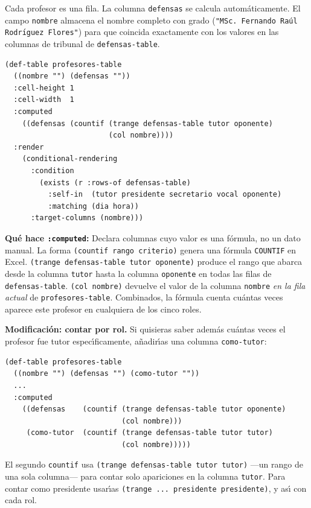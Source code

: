 \documentclass[12pt,a4paper]{report}
\begin{document}
Cada profesor es una fila.
La columna \texttt{defensas} se calcula autom\'aticamente.
El campo \texttt{nombre} almacena el nombre completo con grado
(\texttt{"MSc.\ Fernando Ra\'ul Rodr\'{\i}guez Flores"}) para que
coincida exactamente con los valores en las columnas de tribunal de
\texttt{defensas-table}.

\begin{lstlisting}[caption={tutorial-horario.lisp --- tabla de profesores.},
                   firstnumber=10]
(def-table profesores-table
  ((nombre "") (defensas ""))
  :cell-height 1
  :cell-width  1
  :computed
    ((defensas (countif (trange defensas-table tutor oponente)
                        (col nombre))))
  :render
    (conditional-rendering
      :condition
        (exists (r :rows-of defensas-table)
          :self-in  (tutor presidente secretario vocal oponente)
          :matching (dia hora))
      :target-columns (nombre)))
\end{lstlisting}

\textbf{Qu\'e hace \texttt{:computed}:}
Declara columnas cuyo valor es una f\'ormula, no un dato manual.
La forma \texttt{(countif rango criterio)} genera una f\'ormula
\texttt{COUNTIF} en Excel.
\texttt{(trange defensas-table tutor oponente)} produce el rango que
abarca desde la columna \texttt{tutor} hasta la columna \texttt{oponente}
en todas las filas de \texttt{defensas-table}.
\texttt{(col nombre)} devuelve el valor de la columna \texttt{nombre}
\emph{en la fila actual} de \texttt{profesores-table}.
Combinados, la f\'ormula cuenta cu\'antas veces aparece este profesor
en cualquiera de los cinco roles.

\textbf{Modificaci\'on: contar por rol.}
Si quisieras saber adem\'as cu\'antas veces el profesor fue tutor
espec\'{\i}ficamente, a\~nadir\'{\i}as una columna \texttt{como-tutor}:

\begin{lstlisting}[caption={Columna adicional: solo tutores.},numbers=none]
(def-table profesores-table
  ((nombre "") (defensas "") (como-tutor ""))
  ...
  :computed
    ((defensas    (countif (trange defensas-table tutor oponente)
                           (col nombre)))
     (como-tutor  (countif (trange defensas-table tutor tutor)
                           (col nombre)))))
\end{lstlisting}

El segundo \texttt{countif} usa \texttt{(trange defensas-table tutor tutor)}
---un rango de una sola columna--- para contar solo apariciones en la columna
\texttt{tutor}.
Para contar como presidente usar\'{\i}as \texttt{(trange ... presidente
presidente)}, y as\'{\i} con cada rol.
\end{document}
